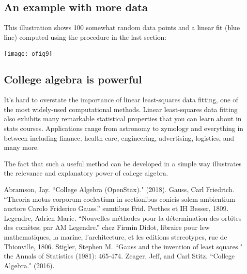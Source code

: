 \documentclass[10pt]{article}
\begin{document}
\subsection*{An example with more data}

This illustration shows 100 somewhat random data points and a linear fit (blue
line) computed using the procedure in the last section:
\begin{center}
\texttt{[image: ofig9]}
\end{center}


\subsection*{College algebra is powerful}

It's hard to overstate the importance of linear least-squares data fitting, one
of the most widely-used computational methods.  Linear least-squares data
fitting also exhibits many remarkable statistical properties that you can learn
about in stats courses.  Applications range from astronomy to zymology and
everything in between including finance, health care, engineering, advertising,
logistics, and many more.

The fact that such a useful method can be developed in a simple way illustrates
the relevance and explanatory power of college algebra.


\begin{thebibliography}{99}
Abramson, Jay. ``College Algebra (OpenStax)." (2018).
Gauss, Carl Friedrich. ``Theoria motus corporum coelestium in sectionibus conicis solem ambientium auctore Carolo Friderico Gauss.'' sumtibus Frid. Perthes et IH Besser, 1809.
Legendre, Adrien Marie. ``Nouvelles méthodes pour la détermination des orbites des comètes; par AM Legendre.'' chez Firmin Didot, libraire pour lew mathematiques, la marine, l'architecture, et les editions stereotypes, rue de Thionville, 1806.
Stigler, Stephen M. ``Gauss and the invention of least squares." the Annals of Statistics (1981): 465-474.
Zeager, Jeff, and Carl Stitz. ``College Algebra." (2016).
\end{thebibliography}
\end{document}
